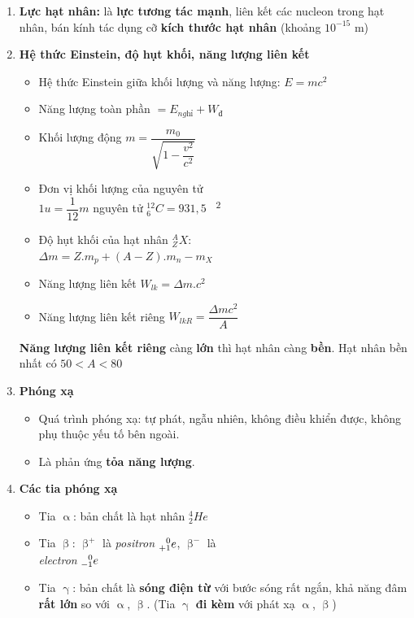 \documentclass[a4paper,12pt,titlepage,twocolumn]{article}
\newenvironment{myitemize} 
{ \begin{itemize}[leftmargin=*,label=-]  %
		\setlength{\itemsep}{0pt}
		\setlength{\parskip}{0pt}
		\setlength{\parsep}{0pt}     }
{ \end{itemize}                  }
\newenvironment{myenumerate}
{ \begin{enumerate}[label=\textbf{\arabic*}.]
\setlist{nolistsep} %
\setlength{\itemsep}{0pt}
\setlength{\parskip}{0pt}
\setlength{\parsep}{0pt}	}
{ \end{enumerate}}
\begin{document}
\begin{myenumerate}
	\item \textbf{Lực hạt nhân:} là \textbf{lực tương tác mạnh}, liên kết các nucleon trong hạt nhân,
	 bán kính tác dụng cỡ \textbf{kích thước hạt nhân} (khoảng $10^{-15}$ \si{\meter})
	\item \textbf{Hệ thức Einstein, độ hụt khối, năng lượng liên kết}
	\begin{myitemize}
		\item Hệ thức Einstein giữa khối lượng và năng lượng: $E=mc^2$ 
		\item Năng lượng toàn phần $=E_{\textit{nghỉ}} + W_{\textit{đ}}$ 
		\item Khối lượng động $m=\dfrac{m_0}{\sqrt{1-\dfrac{v^2}{c^2}}}$ 
		\item Đơn vị khối lượng của nguyên tử \\
		 $1u=\dfrac{1}{12} m$ nguyên tử $^{12}_6C=931,5$ \si[per-mode=symbol]{\mega\eVperc\squared} 
		 \item Độ hụt khối của hạt nhân $^A_ZX$: \\ $\Delta m = Z.m_p + (A-Z).m_n-m_X$
		 \item Năng lượng liên kết $W_{lk} = \Delta m.c^2$
		 \item Năng lượng liên kết riêng $W_{lkR} = \dfrac{\Delta mc^2}{A}$
	\end{myitemize}
	\textbf{Năng lượng liên kết riêng} càng \textbf{lớn} thì hạt nhân càng \textbf{bền}.
	Hạt nhân bền nhất có $50<A<80$
	\item \textbf{Phóng xạ}
	\begin{myitemize}
		\item Quá trình phóng xạ: tự phát, ngẫu nhiên, không điều khiển được, không phụ thuộc yếu tố bên ngoài.
		\item Là phản ứng \textbf{tỏa năng lượng}.
	\end{myitemize}
	\item \textbf{Các tia phóng xạ}
	\begin{myitemize}
		\item Tia $\upalpha$: bản chất là hạt nhân $^4_2He$
		\item Tia $\upbeta$: $\upbeta^{+}$ là \textit{positron} $\prescript{0}{+1}{e}$, $\upbeta^{-}$ là \\ \textit{electron} $\prescript{0}{-1}{e}$
		\item Tia $\upgamma$: bản chất là \textbf{sóng điện từ} với bước sóng rất ngắn, khả năng đâm \textbf{rất lớn} so với $\upalpha$, $\upbeta$. (Tia $\upgamma$ \textbf{đi kèm} với phát xạ $\upalpha$, $\upbeta$)

\end{myitemize}
\end{myenumerate}
\end{document}
